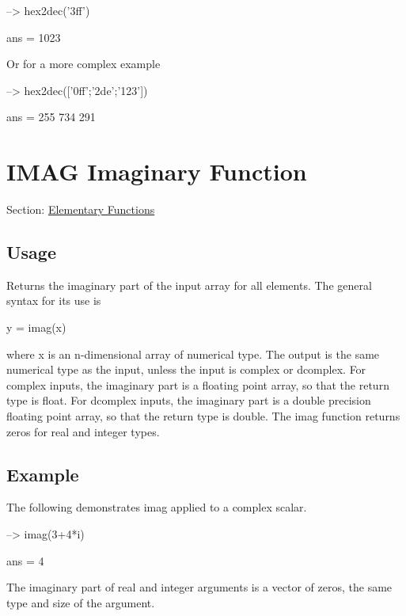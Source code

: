 \begin{DoxyVerbInclude}
--> hex2dec('3ff')

ans = 
 1023 
\end{DoxyVerbInclude}


Or for a more complex example


\begin{DoxyVerbInclude}
--> hex2dec(['0ff';'2de';'123'])

ans = 
 255 
 734 
 291 
\end{DoxyVerbInclude}
 \hypertarget{elementary_imag}{}\section{I\-M\-A\-G Imaginary Function}\label{elementary_imag}
Section\-: \hyperlink{sec_elementary}{Elementary Functions} \hypertarget{vtkwidgets_vtkxyplotwidget_Usage}{}\subsection{Usage}\label{vtkwidgets_vtkxyplotwidget_Usage}
Returns the imaginary part of the input array for all elements. The general syntax for its use is \begin{DoxyVerb}   y = imag(x)
\end{DoxyVerb}
 where {\ttfamily x} is an {\ttfamily n}-\/dimensional array of numerical type. The output is the same numerical type as the input, unless the input is {\ttfamily complex} or {\ttfamily dcomplex}. For {\ttfamily complex} inputs, the imaginary part is a floating point array, so that the return type is {\ttfamily float}. For {\ttfamily dcomplex} inputs, the imaginary part is a double precision floating point array, so that the return type is {\ttfamily double}. The {\ttfamily imag} function returns zeros for real and integer types. \hypertarget{variables_struct_Example}{}\subsection{Example}\label{variables_struct_Example}
The following demonstrates {\ttfamily imag} applied to a complex scalar.


\begin{DoxyVerbInclude}
--> imag(3+4*i)

ans = 
 4 
\end{DoxyVerbInclude}


The imaginary part of real and integer arguments is a vector of zeros, the same type and size of the argument.


